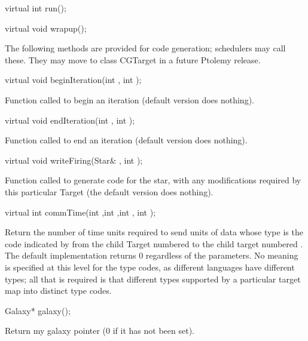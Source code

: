 \begin{example}
virtual int run();
\end{example}

\begin{example}
virtual void wrapup();
\end{example}

The following methods are provided for code generation; schedulers may
call these.  They may move to class CGTarget in a future Ptolemy release.

\begin{example}
virtual void beginIteration(int , int );
\end{example}

Function called to begin an iteration (default version
does nothing).

\begin{example}
virtual void endIteration(int , int );
\end{example}

Function called to end an iteration (default version
does nothing).

\begin{example}
virtual void writeFiring(Star& , int );
\end{example}

Function called to generate code for the star, with any modifications
required by this particular Target (the default version does nothing).

\begin{example}
virtual int commTime(int ,int ,int , int );
\end{example}

Return the number of time units required to send  units of
data whose type is the code indicated by  from the child Target
numbered  to the child target numbered .
The default implementation returns 0 regardless of the parameters.
No meaning is specified at this level for the type codes, as different
languages have different types; all that is required is that different
types supported by a particular target map into distinct type codes.

\begin{example}
Galaxy* galaxy();
\end{example}

Return my galaxy pointer (0 if it has not been set).

